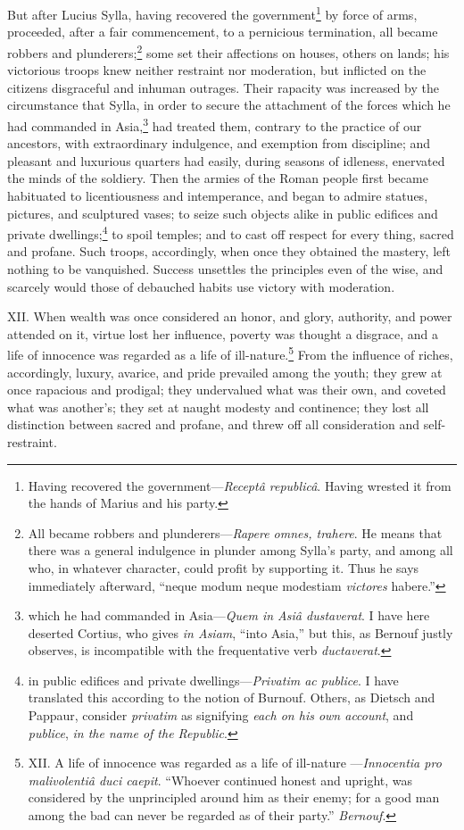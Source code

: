 But after Lucius Sylla, having recovered the government\footnote{Having recovered the government—\emph{Receptâ republicâ}. Having
wrested it from the hands of Marius and his party.} by force
of arms, proceeded, after a fair commencement, to a pernicious
termination, all became robbers and plunderers;\footnote{All became robbers and plunderers—\emph{Rapere omnes, trahere}.
He means that there was a general indulgence in plunder among Sylla's
party, and among all who, in whatever character, could profit by
supporting it. Thus he says immediately afterward, ``neque modum neque
modestiam \emph{victores} habere.''} some set their
affections on houses, others on lands; his victorious troops knew
neither restraint nor moderation, but inflicted on the citizens
disgraceful and inhuman outrages. Their rapacity was increased by the
circumstance that Sylla, in order to secure the attachment of the
forces which he had commanded in Asia,\footnote{which he had commanded in Asia—\emph{Quem in Asiâ dustaverat}. I
have here deserted Cortius, who gives \emph{in Asiam}, ``into Asia,'' but this,
as Bernouf justly observes, is incompatible with the frequentative verb
\emph{ductaverat}.} had treated them, contrary
to the practice of our ancestors, with extraordinary indulgence, and
exemption from discipline; and pleasant and luxurious quarters had
easily, during seasons of idleness, enervated the minds of the
soldiery. Then the armies of the Roman people first became habituated
to licentiousness and intemperance, and began to admire statues,
pictures, and sculptured vases; to seize such objects alike in public
edifices and private dwellings;\footnote{in public edifices and private dwellings—\emph{Privatim ac
publice}. I have translated this according to the notion of Burnouf.
Others, as Dietsch and Pappaur, consider \emph{privatim} as signifying
\emph{each on his own account}, and \emph{publice}, \emph{in the name of the
Republic}.} to spoil temples; and to cast off
respect for every thing, sacred and profane. Such troops, accordingly,
when once they obtained the mastery, left nothing to be vanquished.
Success unsettles the principles even of the wise, and scarcely would
those of debauched habits use victory with moderation.

XII. When wealth was once considered an honor, and glory, authority,
and power attended on it, virtue lost her influence, poverty was
thought a disgrace, and a life of innocence was regarded as a life of
ill-nature.\footnote{XII. A life of innocence was regarded as a life of ill-nature
—\emph{Innocentia pro malivolentiâ duci caepit}. ``Whoever continued honest
and upright, was considered by the unprincipled around him as their
enemy; for a good man among the bad can never be regarded as of their
party.'' \emph{Bernouf}.} From the influence of riches, accordingly, luxury,
avarice, and pride prevailed among the youth; they grew at once
rapacious and prodigal; they undervalued what was their own, and
coveted what was another's; they set at naught modesty and continence;
they lost all distinction between sacred and profane, and threw off
all consideration and self-restraint.

